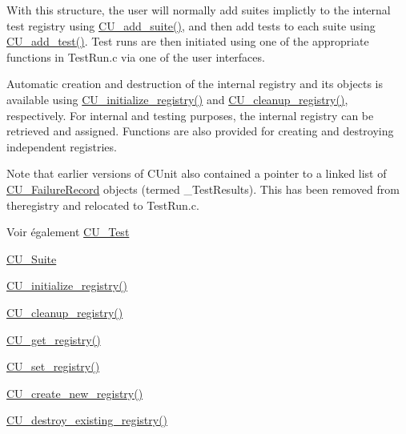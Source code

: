 With this structure, the user will normally add suites implictly to the internal test registry using \hyperlink{group__Framework_ga94b8f1bbbd93b154a60bb1d43391b48a}{C\-U\-\_\-add\-\_\-suite()}, and then add tests to each suite using \hyperlink{group__Framework_gad9f198a8a5fa8cc6870c3c8be873869f}{C\-U\-\_\-add\-\_\-test()}. Test runs are then initiated using one of the appropriate functions in Test\-Run.\-c via one of the user interfaces.\par
\par


Automatic creation and destruction of the internal registry and its objects is available using \hyperlink{group__Framework_ga3477b2d3e57c8f8aba36bbbdfa54920d}{C\-U\-\_\-initialize\-\_\-registry()} and \hyperlink{group__Framework_ga183eb7d7f79e149c767237cfef52cb82}{C\-U\-\_\-cleanup\-\_\-registry()}, respectively. For internal and testing purposes, the internal registry can be retrieved and assigned. Functions are also provided for creating and destroying independent registries.\par
\par


Note that earlier versions of C\-Unit also contained a pointer to a linked list of \hyperlink{structCU__FailureRecord}{C\-U\-\_\-\-Failure\-Record} objects (termed \-\_\-\-Test\-Results). This has been removed from theregistry and relocated to Test\-Run.\-c.

\begin{DoxySeeAlso}{Voir également}
\hyperlink{structCU__Test}{C\-U\-\_\-\-Test} 

\hyperlink{structCU__Suite}{C\-U\-\_\-\-Suite} 

\hyperlink{group__Framework_ga3477b2d3e57c8f8aba36bbbdfa54920d}{C\-U\-\_\-initialize\-\_\-registry()} 

\hyperlink{group__Framework_ga183eb7d7f79e149c767237cfef52cb82}{C\-U\-\_\-cleanup\-\_\-registry()} 

\hyperlink{group__Framework_gacdc4bab7b0492ed1e3a4e076677de22e}{C\-U\-\_\-get\-\_\-registry()} 

\hyperlink{group__Framework_gaaec6d8893d61bfff165775385851562d}{C\-U\-\_\-set\-\_\-registry()} 

\hyperlink{group__Framework_ga5d2ce564b228122842f515cb4e5beda2}{C\-U\-\_\-create\-\_\-new\-\_\-registry()} 

\hyperlink{group__Framework_ga7c46b0ae888482411575c93d5d780b0d}{C\-U\-\_\-destroy\-\_\-existing\-\_\-registry()} 
\end{DoxySeeAlso}


